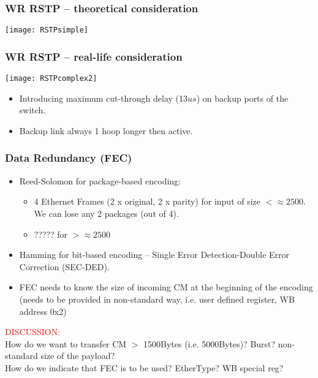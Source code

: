 \documentclass[]{beamer}
\begin{document}
\begin{frame}
  \frametitle{WR RSTP -- theoretical consideration}   

\centering
\texttt{[image: RSTPsimple]}

\end{frame}
\begin{frame}
  \frametitle{WR RSTP -- real-life consideration}   

\centering
\texttt{[image: RSTPcomplex2]}

  \begin{itemize}
    \item Introducing maximum cut-through delay (13$us$) on backup ports of the
          switch.
    \item Backup link always 1 hoop longer then active.
  \end{itemize}

\end{frame}
\begin{frame}
  \frametitle{Data Redundancy (FEC)}   

      \begin{itemize}
      \item Reed-Solomon for package-based encoding:
	\begin{itemize}
	\item  4 Ethernet Frames (2 x original, 2 x parity) for input of size 
	      $<\approx2500$. We can lose any 2 packages (out of 4).
	\item  ????? for $>\approx2500$
	\end{itemize}
      \item Hamming for bit-based encoding -- Single Error Detection-Double
	    Error Correction (SEC-DED).
      \item FEC needs to know the size of incoming CM at the beginning of the
	  encoding (needs to be provided in non-standard way, i.e. user defined
	  register, WB address 0x2)
      \end{itemize}

\centering
\textcolor{red}{DISCUSSION:} \\
{\small
How do we want to transfer CM $>$ 1500Bytes (i.e. 5000Bytes)? Burst?
non-standard size of the payload? \\
How do we indicate that FEC is to be used? EtherType? WB special reg? 
}
\end{frame}
\end{document}
